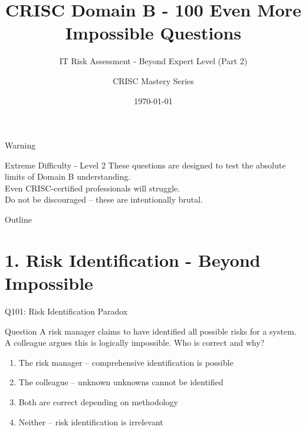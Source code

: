 \documentclass{beamer}
\title{CRISC Domain B - 100 Even More Impossible Questions}
\subtitle{IT Risk Assessment - Beyond Expert Level (Part 2)}
\author{CRISC Mastery Series}
\date{\today}
\begin{document}
	
	\begin{frame}
		\titlepage
	\end{frame}
	
	\begin{frame}{Warning}
		\begin{alertblock}{Extreme Difficulty - Level 2}
			These questions are designed to test the absolute limits of Domain B understanding.\\
			Even CRISC-certified professionals will struggle.\\
			Do not be discouraged -- these are intentionally brutal.
		\end{alertblock}
	\end{frame}
	
	\begin{frame}{Outline}
		\tableofcontents
	\end{frame}
	
	\section{1. Risk Identification - Beyond Impossible}
	
	\begin{frame}{Q101: Risk Identification Paradox}
		\begin{block}{Question}
			A risk manager claims to have identified all possible risks for a system. A colleague argues this is logically impossible. Who is correct and why?
		\end{block}
		\begin{enumerate} 
			\item The risk manager -- comprehensive identification is possible
			\item The colleague -- unknown unknowns cannot be identified
			\item Both are correct depending on methodology
			\item Neither -- risk identification is irrelevant
		\end{enumerate}
	\end{frame}
	
\end{document}
